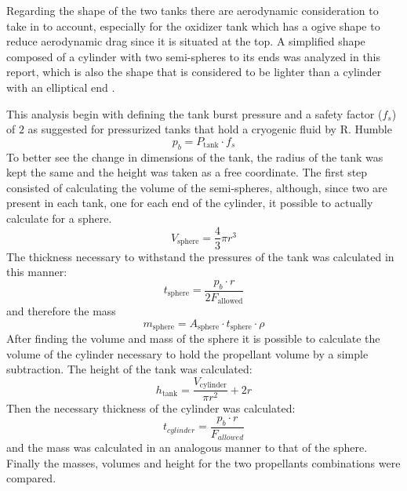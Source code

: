 Regarding the shape of the two tanks there are aerodynamic consideration to take in to account, especially for the oxidizer tank which has a ogive shape to reduce aerodynamic drag since it is situated at the top.
A simplified shape composed of a cylinder with two semi-spheres to its ends was analyzed in this report, which is also the shape that is considered to be lighter than a cylinder with an elliptical end \cite{humble95}.

This analysis begin with defining the tank burst pressure and a safety factor ($f_s$) of $2$ as suggested for pressurized tanks that hold a cryogenic fluid by R. Humble \cite{humble95}
\begin{equation}
    p_b = P_{\text{tank}} \cdot f_s
\end{equation}
To better see the change in dimensions of the tank, the radius of the tank was kept the same and the height was taken as a free coordinate. 
The first step consisted of calculating the volume of the semi-spheres, although,  since two are present in each tank, one for each end of the cylinder, it possible to actually calculate for a sphere.
\begin{equation}
    V_{\text{sphere}} = \frac{4}{3} \pi r^3
\end{equation}
The thickness necessary to withstand the pressures of the tank was calculated in this manner:
\begin{equation}
    t_{\text{sphere}} = \frac{p_b \cdot r}{2F_{\text{allowed}}}
\end{equation}
and therefore the mass 
\begin{equation}
    m_{\text{sphere}} = A_{\text{sphere}} \cdot t_{\text{sphere}} \cdot \rho
\end{equation}
After finding the volume and mass of the sphere it is possible to  calculate the volume of the cylinder necessary to hold the propellant volume by a simple subtraction. The height of the tank was calculated:
\begin{equation}
    h_{\text{tank}} = \frac{V_{\text{cylinder}}}{\pi r^2} + 2r
\end{equation}
Then the necessary thickness of the cylinder was calculated:
\begin{equation}
    t_{cylinder} = \frac{p_b \cdot r }{F_{allowed}} 
\end{equation}
and the mass was calculated in an analogous manner to that of the sphere.
Finally the masses, volumes and  height for the two propellants combinations were compared.
                             
